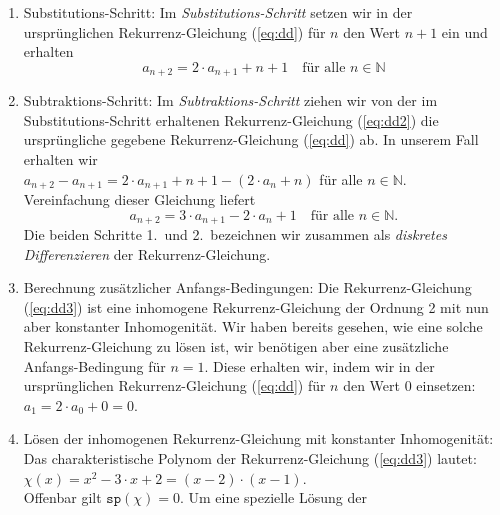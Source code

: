 \begin{enumerate}
\item Substitutions-Schritt: Im \emph{Substitutions-Schritt} setzen wir in der
      ursprünglichen Rekurrenz-Gleichung (\ref{eq:dd}) für $n$ den Wert $n + 1$ ein und
      erhalten 
      \begin{equation}
        \label{eq:dd2}
        a_{n+2} = 2 \cdot a_{n+1} + n + 1 \quad \mbox{für alle $n \in \mathbb{N}$}
      \end{equation}
\item Subtraktions-Schritt: Im \emph{Subtraktions-Schritt} ziehen wir von der im
      Substitutions-Schritt erhaltenen Rekurrenz-Gleichung (\ref{eq:dd2}) die ursprüngliche
      gegebene Rekurrenz-Gleichung (\ref{eq:dd}) ab.  In unserem Fall erhalten wir \\[0.2cm]
      \hspace*{1.3cm} 
      $a_{n+2} - a_{n+1} = 2 \cdot a_{n+1} + n + 1 - \left( 2 \cdot a_n + n \right)$ 
      \quad für alle $n \in \mathbb{N}$.       \\[0.2cm]
      Vereinfachung dieser Gleichung liefert 
      \begin{equation}
        \label{eq:dd3}
        a_{n+2} = 3 \cdot a_{n+1} - 2 \cdot a_n + 1 \quad \mbox{für alle $n \in \mathbb{N}$}.
      \end{equation}
      Die beiden Schritte 1.~und 2.~bezeichnen wir zusammen als 
      \emph{diskretes Differenzieren} der Rekurrenz-Gleichung.
\item Berechnung zusätzlicher Anfangs-Bedingungen: Die Rekurrenz-Gleichung (\ref{eq:dd3})
      ist eine inhomogene Rekurrenz-Gleichung der Ordnung 2 mit nun aber konstanter
      Inhomogenität.  Wir haben bereits gesehen, 
      wie eine solche Rekurrenz-Gleichung zu lösen ist, wir benötigen aber eine
      zusätzliche Anfangs-Bedingung für $n=1$.  Diese erhalten wir, indem wir in der
      ursprünglichen Rekurrenz-Gleichung (\ref{eq:dd}) für $n$ den Wert 0 einsetzen: \\[0.2cm]
      \hspace*{1.3cm} $a_1 = 2 \cdot a_0 + 0 = 0$.
\item Lösen der inhomogenen Rekurrenz-Gleichung mit konstanter Inhomogenität:
      Das charakteristische Polynom der Rekurrenz-Gleichung (\ref{eq:dd3}) lautet: \\[0.2cm]
      \hspace*{1.3cm} $\chi(x) = x^2 - 3 \cdot x + 2 = (x - 2) \cdot (x - 1)$. \\[0.2cm]
      Offenbar gilt $\mathtt{sp}(\chi) = 0$.  Um eine spezielle Lösung der

\end{enumerate}
